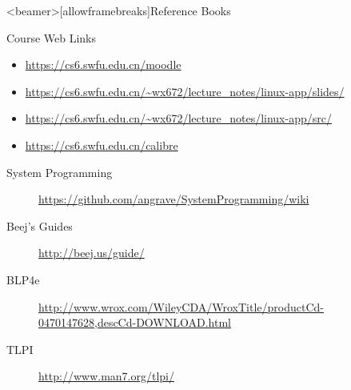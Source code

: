 \mode*
{}


\begin{frame}<beamer>[allowframebreaks]{Reference Books}
  \begin{refsection}
    \textbooks \printbibliography[heading=none]
  \end{refsection}
\end{frame}

\begin{frame}{Course Web Links}
  \begin{itemize}
  \item[\moodle] \url{https://cs6.swfu.edu.cn/moodle}
  \item[\pdf] \url{https://cs6.swfu.edu.cn/~wx672/lecture_notes/linux-app/slides/}
  \item[\folder] \url{https://cs6.swfu.edu.cn/~wx672/lecture_notes/linux-app/src/}
  \item[\obook] \url{https://cs6.swfu.edu.cn/calibre}
  \end{itemize}
  \begin{description}
  \item[System Programming] \url{https://github.com/angrave/SystemProgramming/wiki}
  \item[Beej's Guides] \url{http://beej.us/guide/}
  \item[BLP4e] \url{http://www.wrox.com/WileyCDA/WroxTitle/productCd-0470147628,descCd-DOWNLOAD.html}
  \item[TLPI] \url{http://www.man7.org/tlpi/}
  \end{description}
\end{frame}

